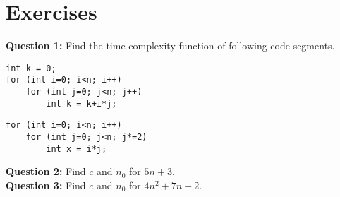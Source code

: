 \documentclass[12pt,a4paper]{article}
\begin{document}
\section{Exercises}
\noindent\textbf{Question 1:} Find the time complexity function of following code segments.
\begin{lstlisting}
int k = 0;
for (int i=0; i<n; i++)
    for (int j=0; j<n; j++)
        int k = k+i*j;
\end{lstlisting}
\begin{lstlisting}
for (int i=0; i<n; i++)
    for (int j=0; j<n; j*=2)
        int x = i*j;
\end{lstlisting}
\noindent\textbf{Question 2:} Find $c$ and $n_0$ for $5n+3$.\\[0.2cm]
\noindent\textbf{Question 3:} Find $c$ and $n_0$ for $4n^2+7n-2$.


\end{document}
